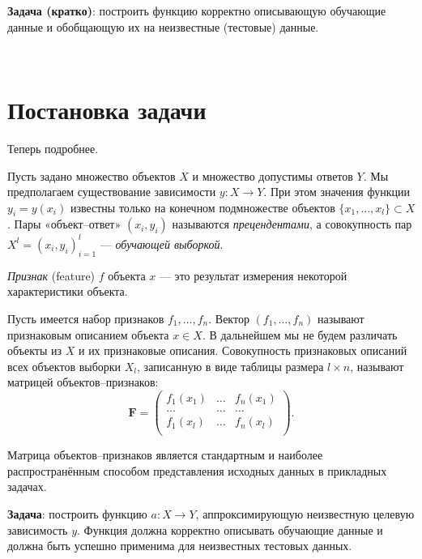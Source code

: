 \documentclass[11pt,a4paper]{article}
\begin{document}
\textbf{Задача (кратко)}: построить функцию корректно описывающую
обучающие данные и обобщающую их на неизвестные (тестовые) данные.


    { \hspace*{\fill} \\}
    
    \hypertarget{ux43fux43eux441ux442ux430ux43dux43eux432ux43aux430-ux437ux430ux434ux430ux447ux438}{%
\section{Постановка
задачи}\label{ux43fux43eux441ux442ux430ux43dux43eux432ux43aux430-ux437ux430ux434ux430ux447ux438}}

Теперь подробнее.

Пусть задано множество объектов \(X\) и множество допустимы ответов
\(Y\). Мы предполагаем существование зависимости \(y:X \rightarrow Y\).
При этом значения функции \(y_i = y(x_i)\) известны только на конечном
подмножестве объектов \(\{x_1, \ldots, x_l\} \subset X\). Пары
«объект--ответ» \((x_i, y_i)\) называются \emph{прецендентами}, а
совокупность пар \(X^l = (x_i, y_i)_{i=1}^l\) --- \emph{обучающей
выборкой}.

\emph{Признак} (feature) \(f\) объекта \(x\) --- это результат измерения
некоторой характеристики объекта.

Пусть имеется набор признаков \(f_1, \ldots, f_n\). Вектор
\((f_1, \ldots, f_n)\) называют признаковым описанием объекта
\(x \in X\). В дальнейшем мы не будем различать объекты из \(X\) и их
признаковые описания. Совокупность признаковых описаний всех объектов
выборки \(X_l\), записанную в виде таблицы размера \(l \times n\),
называют матрицей объектов--признаков: \[
  \mathbf{F} = 
  \begin{pmatrix}
    f_1(x_1) & \ldots & f_n(x_1) \\
    \ldots   & \ldots & \ldots   \\
    f_1(x_l) & \ldots & f_n(x_l) \\
  \end{pmatrix}.
\]

Матрица объектов--признаков является стандартным и наиболее
распространённым способом представления исходных данных в прикладных
задачах.

\textbf{Задача}: построить функцию \(a: X \rightarrow Y\),
аппроксимирующую неизвестную целевую зависимость \(y\). Функция должна
корректно описывать обучающие данные и должна быть успешно применима для
неизвестных тестовых данных.
\end{document}
